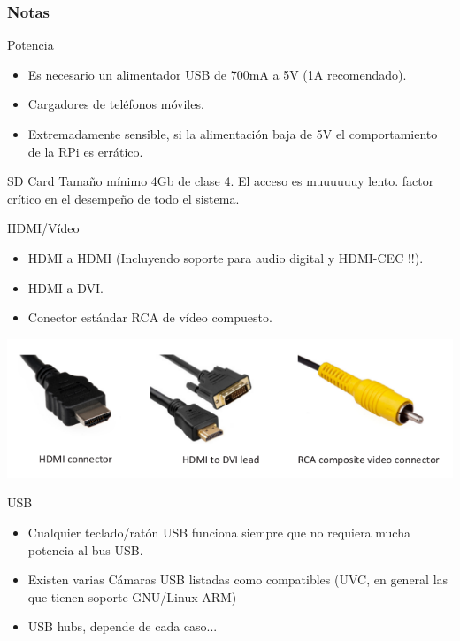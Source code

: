 \documentclass[10pt,colorlinks]{beamer}
\begin{document}


\begin{frame}[allowframebreaks]\frametitle{Notas}
\begin{block}{Potencia}
\begin{itemize}
    \item Es necesario un alimentador USB de 700mA a 5V (1A recomendado). 
    \item Cargadores de teléfonos móviles. 
    \item Extremadamente sensible, si la alimentación baja de 5V el comportamiento de la RPi es errático. 
\end{itemize}
\end{block}

\begin{block}{SD Card}
Tamaño mínimo 4Gb de clase 4. El acceso es muuuuuuy lento. factor crítico en el desempeño de todo el sistema. 
\end{block}
\begin{block}{HDMI/Vídeo}
\begin{itemize}
    \item HDMI a HDMI (Incluyendo soporte para audio digital y HDMI-CEC !!).
    \item HDMI a DVI.
    \item Conector estándar RCA de vídeo compuesto.
\end{itemize}
\end{block}


 \begin{center}
    \includegraphics[width=\textwidth]{figs/leads}
\end{center}


\begin{block}{USB}
\begin{itemize}
    \item Cualquier teclado/ratón USB funciona siempre que no requiera mucha potencia al bus USB.
    \item Existen varias Cámaras USB listadas como compatibles (UVC, en general las que tienen soporte GNU/Linux ARM)  
    \item USB hubs, depende de cada caso... 
\end{itemize}
\end{block}


\end{frame}
\end{document}
